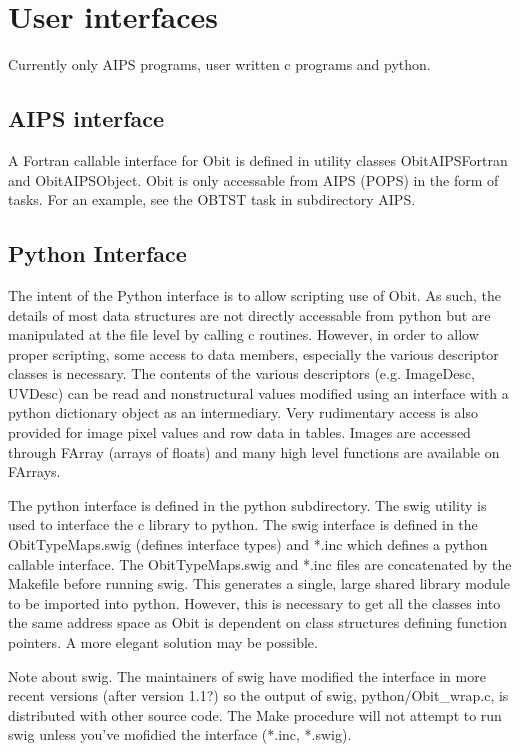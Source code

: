 \documentclass[11pt]{article}
\begin{document}
\section{User interfaces}
Currently only AIPS programs, user written c programs and python.

\subsection{AIPS interface}
A Fortran callable interface for Obit is defined in utility classes
ObitAIPSFortran and ObitAIPSObject.
Obit is only accessable from AIPS (POPS) in the form of tasks.
For an example, see the OBTST task in subdirectory AIPS.

\subsection{Python Interface}
The intent of the Python interface is to allow scripting use of Obit.
As such, the details of most data structures are not directly
accessable from python but are manipulated at the file level by
calling c routines.
However, in order to allow proper scripting, some access to data
members, especially the various descriptor classes is necessary.
The contents of the various descriptors (e.g. ImageDesc, UVDesc) can
be read and nonstructural values modified using an interface with a
python dictionary object as an intermediary.
Very rudimentary access is also provided for image pixel values and
row data in tables.
Images are accessed through FArray (arrays of floats) and many high
level functions are available on FArrays.

The python interface is defined in the python subdirectory.
The swig utility is used to interface the c library to python.
The swig interface is defined in the ObitTypeMaps.swig (defines
interface types) and *.inc which defines a python callable interface.
The ObitTypeMaps.swig and *.inc files are concatenated by the Makefile
before running swig.
This generates a single, large shared library module to be imported
into python.
However, this is necessary to get all the classes into the same
address space as Obit is dependent on class structures defining
function pointers.
A more elegant solution may be possible.

Note about swig.  The maintainers of swig have modified the interface 
in more recent versions (after version 1.1?) so the output of swig, 
python/Obit\_wrap.c, is distributed with other source code.  The Make 
procedure will not attempt to run swig unless you've mofidied the interface
(*.inc, *.swig).
\end{document}

